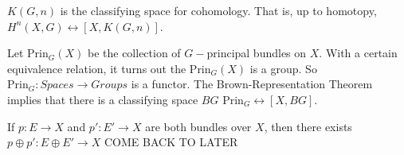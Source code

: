                 \begin{theorem}
                    $K(G,n)$ is the classifying space for cohomology. That is,
                    up to homotopy, $H^{n}(X,G)\leftrightarrow[X,K(G,n)]$.
                \end{theorem}
                Let $\textrm{Prin}_{G}(X)$ be the collection
                of $G-$principal bundles on $X$. With a
                certain equivalence relation, it turns out
                the $\textrm{Prin}_{G}(X)$ is a group. So
                $\textrm{Prin}_{G}:\textit{Spaces}\rightarrow%
                 \textit{Groups}$
                is a functor. The Brown-Representation
                Theorem implies that there is a classifying
                space $BG$
                $\textrm{Prin}_{G}\leftrightarrow[X,BG]$.
                \begin{theorem}
                    If $p:E\rightarrow X$ and $p':E'\rightarrow X$
                    are both bundles over $X$, then there exists
                    $p\oplus p':E\oplus E' \rightarrow X$
                    COME BACK TO LATER
                \end{theorem}
